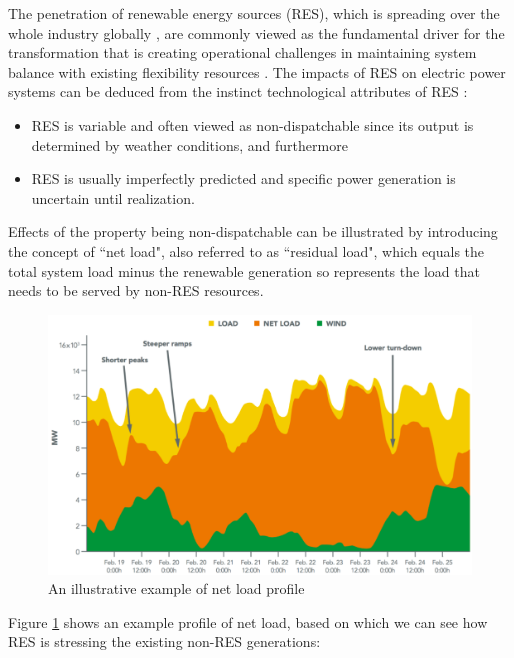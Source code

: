 The penetration of renewable energy sources (RES), which is spreading over the whole industry globally \cite{Agency2016}, are commonly viewed as the fundamental driver for the transformation that is creating operational challenges in maintaining system balance with existing flexibility resources \cite{Cochran2014,Wang2017,Lund2015,FraunhoferIWES2015,Muller2016,Kwon2014,Kondziella2016,Papaefthymiou2016,Alizadeh2016,Bertsch2016}. The impacts of RES on electric power systems can be deduced from the instinct technological attributes of RES \cite{Kondziella2016,Edenhofer2013}:
\begin{itemize}
	\item RES is variable and often viewed as non-dispatchable since its output is determined by weather conditions, and furthermore
	\item RES is usually imperfectly predicted and specific power generation is uncertain until realization.
\end{itemize}

Effects of the property being non-dispatchable can be illustrated by introducing the concept of ``net load", also referred to as ``residual load", which equals the total system load minus the renewable generation so represents the load that needs to be served by non-RES resources\cite{Cochran2014,Muller2016,Ueckerdt2015}.

\begin{figure}[h!]
	\centering
	\includegraphics[width=0.9\linewidth]{Figures/NetLoad}
	\caption{An illustrative example of net load profile \cite{Cochran2014}}
	\label{fig:net-load}
\end{figure}

Figure \ref{fig:net-load} shows an example profile of net load, based on which we can see how RES is stressing the existing non-RES generations:


